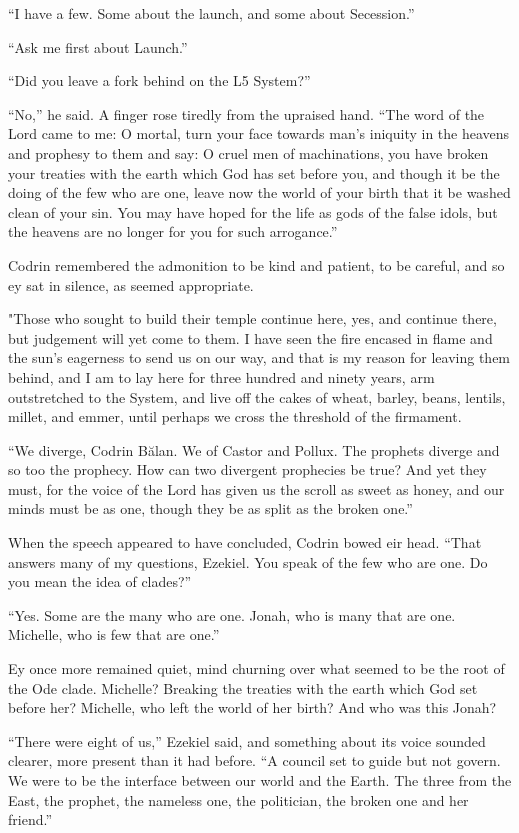 ``I have a few. Some about the launch, and some about Secession.''

``Ask me first about Launch.''

``Did you leave a fork behind on the L5 System?''

``No,'' he said. A finger rose tiredly from the upraised hand. ``The word of the Lord came to me: O mortal, turn your face towards man's iniquity in the heavens and prophesy to them and say: O cruel men of machinations, you have broken your treaties with the earth which God has set before you, and though it be the doing of the few who are one, leave now the world of your birth that it be washed clean of your sin. You may have hoped for the life as gods of the false idols, but the heavens are no longer for you for such arrogance.''

Codrin remembered the admonition to be kind and patient, to be careful, and so ey sat in silence, as seemed appropriate.

"Those who sought to build their temple continue here, yes, and continue there, but judgement will yet come to them. I have seen the fire encased in flame and the sun's eagerness to send us on our way, and that is my reason for leaving them behind, and I am to lay here for three hundred and ninety years, arm outstretched to the System, and live off the cakes of wheat, barley, beans, lentils, millet, and emmer, until perhaps we cross the threshold of the firmament.

``We diverge, Codrin Bălan. We of Castor and Pollux. The prophets diverge and so too the prophecy. How can two divergent prophecies be true? And yet they must, for the voice of the Lord has given us the scroll as sweet as honey, and our minds must be as one, though they be as split as the broken one.''

When the speech appeared to have concluded, Codrin bowed eir head. ``That answers many of my questions, Ezekiel. You speak of the few who are one. Do you mean the idea of clades?''

``Yes. Some are the many who are one. Jonah, who is many that are one. Michelle, who is few that are one.''

Ey once more remained quiet, mind churning over what seemed to be the root of the Ode clade. Michelle? Breaking the treaties with the earth which God set before her? Michelle, who left the world of her birth? And who was this Jonah?

``There were eight of us,'' Ezekiel said, and something about its voice sounded clearer, more present than it had before. ``A council set to guide but not govern. We were to be the interface between our world and the Earth. The three from the East, the prophet, the nameless one, the politician, the broken one and her friend.''

